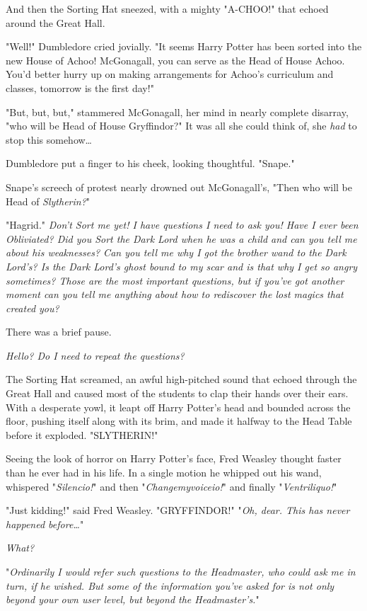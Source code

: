 And then the Sorting Hat sneezed, with a mighty "A-CHOO!" that echoed around
the Great Hall.

"Well!" Dumbledore cried jovially. "It seems Harry Potter has been sorted into
the new House of Achoo! McGonagall, you can serve as the Head of House Achoo.
You'd better hurry up on making arrangements for Achoo's curriculum and
classes, tomorrow is the first day!"

"But, but, but," stammered McGonagall, her mind in nearly complete disarray,
"who will be Head of House Gryffindor?" It was all she could think of, she
\emph{had} to stop this somehow{\ldots}

Dumbledore put a finger to his cheek, looking thoughtful. "Snape."

Snape's screech of protest nearly drowned out McGonagall's, "Then who will be
Head of \emph{Slytherin?}"

"Hagrid."
\later
\emph{Don't Sort me yet! I have questions I need to ask you! Have I ever been
Obliviated? Did you Sort the Dark Lord when he was a child and can you tell me
about his weaknesses? Can you tell me why I got the brother wand to the Dark
Lord's? Is the Dark Lord's ghost bound to my scar and is that why I get so
angry sometimes? Those are the most important questions, but if you've got
another moment can you tell me anything about how to rediscover the lost magics
that created you?}

There was a brief pause.

\emph{Hello? Do I need to repeat the questions?}

The Sorting Hat screamed, an awful high-pitched sound that echoed through the
Great Hall and caused most of the students to clap their hands over their ears.
With a desperate yowl, it leapt off Harry Potter's head and bounded across the
floor, pushing itself along with its brim, and made it halfway to the Head
Table before it exploded.
\later
"SLYTHERIN!"

Seeing the look of horror on Harry Potter's face, Fred Weasley thought faster
than he ever had in his life. In a single motion he whipped out his wand,
whispered "\emph{Silencio!}" and then "\emph{Changemyvoiceio!}" and finally
"\emph{Ventriliquo!}"

"Just kidding!" said Fred Weasley. "GRYFFINDOR!"
\later
"\emph{Oh, dear. This has never happened before{\ldots}}"

\emph{What?}

"\emph{Ordinarily I would refer such questions to the Headmaster, who could ask
me in turn, if he wished. But some of the information you've asked for is not
only beyond your own user level, but beyond the Headmaster's.}"

